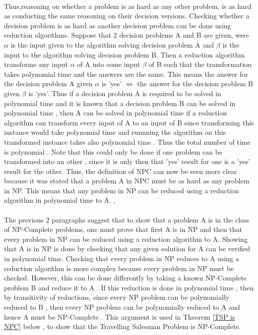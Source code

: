 \documentclass{article}
\begin{document}
\\
Thus,reasoning on whether a problem is as hard as any other problem, is as hard as conducting the same reasoning on their decision versions. Checking whether a decision problem is as hard as another decision problem can be done using reduction algorithms. Suppose that 2 decision problems A and B are given, were $\alpha$ is the input given to the algorithm solving decision problem A and $\beta$ is the input to the algorithm solving decision problem B. Then a reduction algorithm transforms any input $\alpha$ of A into some input $\beta$ of B such that the transformation takes polynomial time and the answers are the same. This means the answer for the decision problem A given $\alpha$ is 'yes' $\iff$ the answer for the decision problem B given $\beta$ is 'yes'. Thus if a decision problem A is required to be solved in polynomial time and it is known that a decision problem B can be solved in polynomial time , then A can be solved in polynomial time if a reduction algorithm can transform every input of A to an input of B since transforming this instance would take polynomial time and runnning the algorithm on this transformed instance takes also polynomial time . Thus the total number of time is polynomial . Note that this could only be done if one problem can be transformed into an other , since it is only then that 'yes' result for one is a 'yes' result for the other. Thus, the definition of NPC can now be seen more clear because it was stated that a problem A in NPC must be as hard as any problem in NP. This means that any problem in NP can be reduced using a reduction algorithm in polynomial time to A. \cite{geeksforgeeks_2018_2}, \cite{cormen_leiserson_rivest_stein}\\
\\
The previous 2 paragraphs suggest that to show that a problem A is in the class of NP-Complete problems, one must prove that first A is in NP and then that every problem in NP can be reduced using a reduction algorithm to A. Showing that A is in NP is done by checking that any given solution for A can be verified in polynomial time. Checking that every problem in NP reduces to A using a reduction algorithm is more complex because every problem in NP must be checked. However, this can be done differently by taking a known NP-Complete problem B and reduce it to A . If this reduction is done in polynomial time , then by transitivity of reductions, since every NP problem can be polynomially reduced to B , then every NP problem can be polynomially reduced to A and hence A must be NP-Complete . This argument is used in Theorem \ref{TSP is NPC} below , to show that the Travelling Salesman Problem is NP-Complete. \cite{geeksforgeeks_2018_2}
\end{document}
